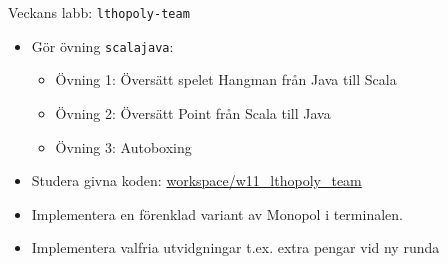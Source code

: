 

\ifkompendium\else

\begin{Slide}{Veckans labb: \texttt{lthopoly-team}}\SlideFontSmall
{}
\begin{itemize}
\item Gör övning \texttt{scalajava}:
\begin{itemize}\SlideFontSmall
\item Övning 1: Översätt spelet Hangman från Java till Scala
\item Övning 2: Översätt Point från Scala till Java
\item Övning 3: Autoboxing
\end{itemize}
\item Studera givna koden: {%
 \href{https://github.com/lunduniversity/introprog/tree/master/workspace/w11_lthopoly_team/src/main}{workspace/w11\_lthopoly\_team}}
\end{itemize}
\begin{itemize}
\item Implementera en förenklad variant av Monopol i terminalen.
\end{itemize}
\begin{itemize}
\item Implementera valfria utvidgningar t.ex. extra pengar vid ny runda
\end{itemize}
\end{Slide}


\fi











